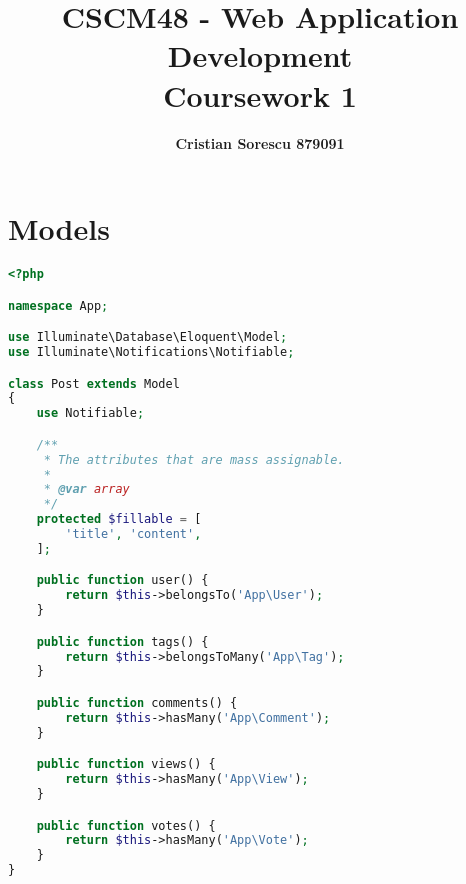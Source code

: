 \documentclass[11pt, oneside]{article}   	%
\title{\textbf{CSCM48 - Web Application Development} \\ Coursework 1}
\author{\bf Cristian Sorescu 879091}
\begin{document}
\maketitle

\newpage
\tableofcontents
\newpage

\section{Models}
\begin{lstlisting}[showstringspaces=false, title=Post.java, language=PHP, frame=single]
<?php

namespace App;

use Illuminate\Database\Eloquent\Model;
use Illuminate\Notifications\Notifiable;

class Post extends Model
{
    use Notifiable;

    /**
     * The attributes that are mass assignable.
     *
     * @var array
     */
    protected $fillable = [
        'title', 'content',
    ];

    public function user() {
        return $this->belongsTo('App\User');
    }

    public function tags() {
        return $this->belongsToMany('App\Tag');
    }

    public function comments() {
        return $this->hasMany('App\Comment');
    }

    public function views() {
        return $this->hasMany('App\View');
    }

    public function votes() {
        return $this->hasMany('App\Vote');
    }
}
\end{lstlisting}
\end{document}

